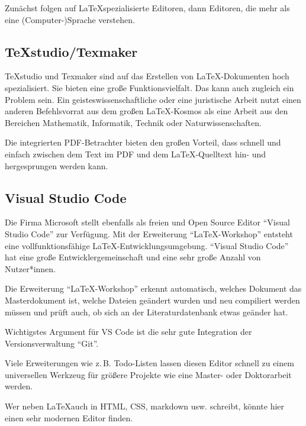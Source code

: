 \documentclass[12pt,	%
				headings=small,		%
				toc=bibliography,	%
			]	%
{scrreprt}		%
\begin{document}
	Zunächst folgen auf \LaTeX spezialisierte Editoren, dann Editoren, die mehr als eine (Computer-)Sprache verstehen. 
	\subsection{TeXstudio/Texmaker}
	\label{sub:TeXStudioTexMaker}
		TeXstudio\autocite{texstudio} und Texmaker\autocite{texmaker} sind auf das Erstellen von \LaTeX-Dokumenten hoch spezialisiert. Sie bieten eine große Funktionsvielfalt. Das kann auch zugleich ein Problem sein. Ein geisteswissenschaftliche oder eine juristische Arbeit nutzt einen anderen Befehlsvorrat aus dem großen \LaTeX-Kosmos als eine Arbeit aus den Bereichen Mathematik, Informatik, Technik oder Naturwissenschaften. 

		Die integrierten PDF-Betrachter bieten den großen Vorteil, dass schnell und einfach zwischen dem Text im PDF und dem \LaTeX-Quelltext hin- und hergesprungen werden kann.
			

	\subsection{Visual Studio Code}
	\label{sub:VisualStudioCode}
	Die Firma Microsoft stellt ebenfalls als freien und Open Source Editor \enquote{Visual Studio Code} zur Verfügung.\autocite{VSCode} Mit der Erweiterung \enquote{LaTeX-Workshop} entsteht eine vollfunktionsfähige \LaTeX-Entwicklungsumgebung. \enquote{Visual Studio Code} hat eine große Entwicklergemeinschaft und eine sehr große Anzahl von Nutzer*innen. 

	Die Erweiterung \enquote{LaTeX-Workshop} erkennt automatisch, welches Dokument das Masterdokument ist, welche Dateien geändert wurden und neu compiliert werden müssen und prüft auch, ob sich an der Literaturdatenbank etwas geänder hat.\autocite{VSCode:LatexWorkshop}

	Wichtigstes Argument für VS Code ist die sehr gute Integration der Versionsverwaltung \enquote{Git}.

	Viele Erweiterungen wie z.\,B. Todo-Listen lassen diesen Editor schnell zu einem universellen Werkzeug für größere Projekte wie eine Master- oder Doktorarbeit werden.

	Wer neben \LaTeX auch in HTML, CSS, markdown usw. schreibt, könnte hier einen sehr modernen Editor finden.

\end{document}
